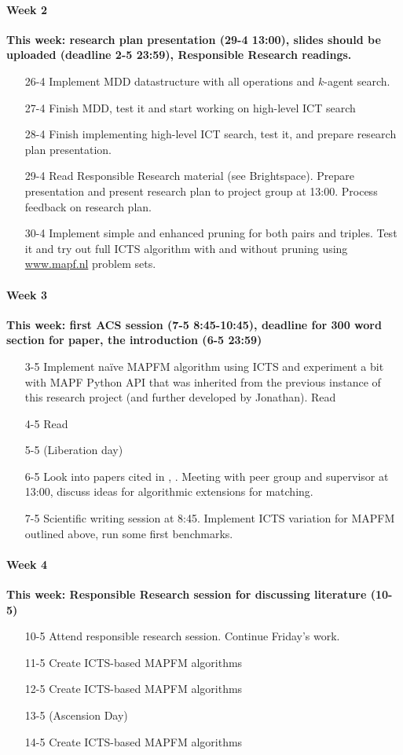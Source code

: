 \documentclass[a4paper,10pt,english]{article}
\begin{document}
	\paragraph{Week 2} \textbf{This week: research plan presentation (29-4 13:00), slides should be uploaded (deadline 2-5 23:59), Responsible Research readings.}
	\begin{enumerate}
		\item[26-4 ] Implement MDD datastructure with all operations and $k$-agent search.
		\item[27-4 ] Finish MDD, test it and start working on high-level ICT search
		\item[28-4 ] Finish implementing high-level ICT search, test it, and prepare research plan presentation.
		\item[29-4 ] Read Responsible Research material (see Brightspace). Prepare presentation and present research plan to project group at 13:00. Process feedback on research plan.
		\item[30-4 ] Implement simple and enhanced pruning for both pairs and triples. Test it and try out full ICTS algorithm with and without pruning using \url{www.mapf.nl} problem sets.
	\end{enumerate}
	\paragraph{Week 3} \textbf{This week: first ACS session (7-5 8:45-10:45), deadline for 300 word section for paper, the introduction (6-5 23:59)}
	\begin{enumerate}
		\item[3-5 ] Implement naïve MAPFM algorithm using ICTS and experiment a bit with MAPF Python API that was inherited from the previous instance of this research project (and further developed by Jonathan). Read \cite{ma2016}
		\item[4-5 ] Read \cite{henkel2019}
		\item[5-5 ] (Liberation day)
		\item[6-5 ] Look into papers cited in \cite{ma2016}, \cite{henkel2019}. Meeting with peer group and supervisor at 13:00, discuss ideas for algorithmic extensions for matching.
		\item[7-5 ] Scientific writing session at 8:45. Implement ICTS variation for MAPFM outlined above, run some first benchmarks.
	\end{enumerate}
	\paragraph{Week 4} \textbf{This week: Responsible Research session for discussing literature (10-5)}
	\begin{enumerate}
		\item[10-5 ] Attend responsible research session. Continue Friday's work.
		\item[11-5 ] Create ICTS-based MAPFM algorithms
		\item[12-5 ] Create ICTS-based MAPFM algorithms
		\item[13-5 ] (Ascension Day)
		\item[14-5 ] Create ICTS-based MAPFM algorithms
	\end{enumerate}
\end{document}
